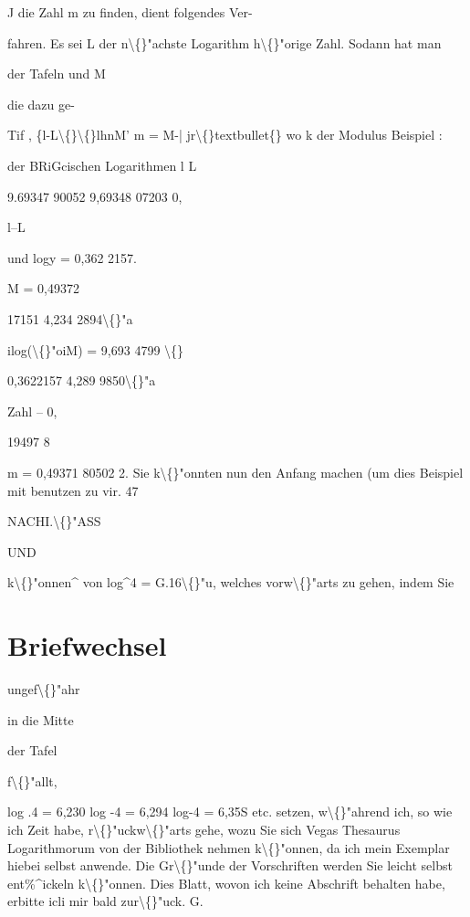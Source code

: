 \documentclass[10pt,a4paper]{article}
\begin{document}
J die Zahl m zu finden, dient folgendes Ver-

fahren. Es sei L der n\textbackslash\{\}"achste Logarithm
h\textbackslash\{\}"orige Zahl. Sodann hat man

der Tafeln und M

die dazu ge-

Tif , \{l-L\textbackslash\{\}\textbackslash\{\}lhnM'
m = M-|
jr\textbackslash\{\}textbullet\{\}
wo k der Modulus
Beispiel :

der BRiGcischen Logarithmen
l
L

9.69347 90052
9,69348 07203
0,

l--L

und logy = 0,362 2157.

M = 0,49372

17151
4,234 2894\textbackslash\{\}"a

ilog(\textbackslash\{\}"oiM) = 9,693 4799
\textbackslash\{\}

0,3622157
4,289 9850\textbackslash\{\}"a

Zahl -- 0,

19497 8

m = 0,49371 80502 2.
Sie k\textbackslash\{\}"onnten nun den Anfang machen (um dies Beispiel mit benutzen zu
vir.
47

\newpage

NACHI.\textbackslash\{\}"ASS

UND

k\textbackslash\{\}"onnen\textasciicircum{} von log\textasciicircum{}4 = G.16\textbackslash\{\}"u, welches
vorw\textbackslash\{\}"arts zu gehen, indem Sie

\section*{Briefwechsel}

ungef\textbackslash\{\}"ahr

in die Mitte

der Tafel

f\textbackslash\{\}"allt,

log .4 = 6,230
log -4 = 6,294
log-4 = 6,35S etc.
setzen, w\textbackslash\{\}"ahrend ich, so wie ich Zeit habe, r\textbackslash\{\}"uckw\textbackslash\{\}"arts gehe, wozu Sie sich
Vegas Thesaurus Logarithmorum von der Bibliothek nehmen k\textbackslash\{\}"onnen, da ich
mein Exemplar hiebei selbst anwende. Die Gr\textbackslash\{\}"unde der Vorschriften werden
Sie leicht selbst ent\%\textasciicircum{}ickeln k\textbackslash\{\}"onnen. Dies Blatt, wovon ich keine Abschrift
behalten habe, erbitte icli mir bald zur\textbackslash\{\}"uck.
G.
\end{document}
